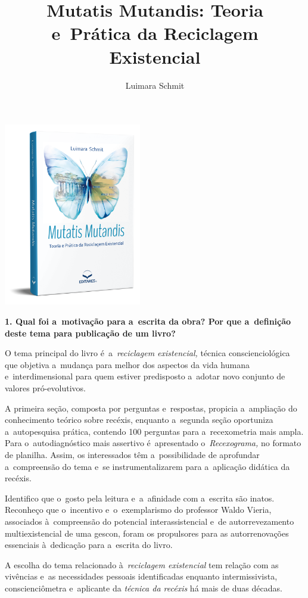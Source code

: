 \documentclass{gescons}
\author{Luimara Schmit}
\title{Mutatis Mutandis: Teoria e~Prática da Reciclagem Existencial}
\begin{document}
    \makeentrevistatitle

    \begin{multicols}{2}

\begin{center}
    \includegraphics[width=6cm]{articles/entrevista/mockups/Luimara.png}
\end{center}

\textbf{1. Qual foi a~motivação para a~escrita da obra? Por que a~definição deste tema para publicação de um livro?}


O tema principal do livro é~a~\emph{reciclagem existencial,} técnica conscienciológica que objetiva a~mudança para melhor dos aspectos da vida humana e~interdimensional para quem estiver predisposto a~adotar novo conjunto de valores pró-evolutivos.

A primeira seção, composta por perguntas e~respostas, propicia a~ampliação do conhecimento teórico sobre recéxis, enquanto a~segunda seção oportuniza a~autopesquisa prática, contendo 100 perguntas para a~recexometria mais ampla. Para o~autodiagnóstico mais assertivo é~apresentado o~\emph{Recexograma,} no formato de planilha. Assim, os interessados têm a~possibilidade de aprofundar a~compreensão do tema e~se instrumentalizarem para a~aplicação didática da recéxis.

Identifico que o~gosto pela leitura e~a~afinidade com a~escrita são inatos. Reconheço que o~incentivo e~o~exemplarismo do professor Waldo Vieria, associados à~compreensão do potencial interassistencial e~de autorrevezamento multiexistencial de uma gescon, foram os propulsores para as autorrenovações essenciais à~dedicação para a~escrita do livro.

A escolha do tema relacionado à~\emph{reciclagem existencial} tem relação com as vivências e~as necessidades pessoais identificadas enquanto intermissivista, conscienciômetra e~aplicante da \emph{técnica da recéxis} há mais de duas décadas.


\end{multicols}
\end{document}
